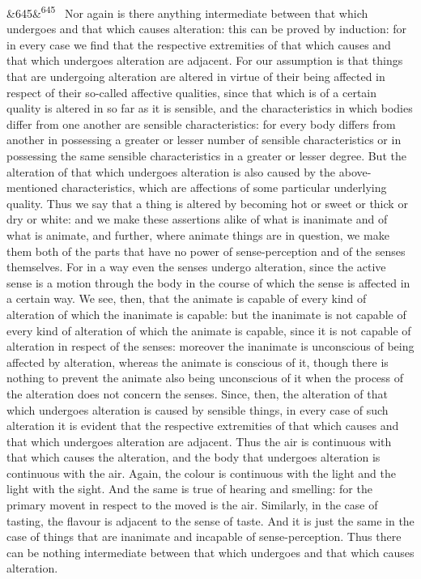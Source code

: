 \documentclass[12pt]{article}
\newcommand{\para}[1][]{\par\noindent\ifx&#1&\else\textsuperscript{\footnotesize #1}~\fi}
\begin{document}
\para[645] Nor again is there anything intermediate between that which undergoes and that which causes alteration: this can be proved by induction: for in every case we find that the respective extremities of that which causes and that which undergoes alteration are adjacent. For our assumption is that things that are undergoing alteration are altered in virtue of their being affected in respect of their so-called affective qualities, since that which is of a certain quality is altered in so far as it is sensible, and the characteristics in which bodies differ from one another are sensible characteristics: for every body differs from another in possessing a greater or lesser number of sensible characteristics or in possessing the same sensible characteristics in a greater or lesser degree. But the alteration of that which undergoes alteration is also caused by the above-mentioned characteristics, which are affections of some particular underlying quality. Thus we say that a thing is altered by becoming hot or sweet or thick or dry or white: and we make these assertions alike of what is inanimate and of what is animate, and further, where animate things are in question, we make them both of the parts that have no power of sense-perception and of the senses themselves. For in a way even the senses undergo alteration, since the active sense is a motion through the body in the course of which the sense is affected in a certain way. We see, then, that the animate is capable of every kind of alteration of which the inanimate is capable: but the inanimate is not capable of every kind of alteration of which the animate is capable, since it is not capable of alteration in respect of the senses: moreover the inanimate is unconscious of being affected by alteration, whereas the animate is conscious of it, though there is nothing to prevent the animate also being unconscious of it when the process of the alteration does not concern the senses. Since, then, the alteration of that which undergoes alteration is caused by sensible things, in every case of such alteration it is evident that the respective extremities of that which causes and that which undergoes alteration are adjacent. Thus the air is continuous with that which causes the alteration, and the body that undergoes alteration is continuous with the air. Again, the colour is continuous with the light and the light with the sight. And the same is true of hearing and smelling: for the primary movent in respect to the moved is the air. Similarly, in the case of tasting, the flavour is adjacent to the sense of taste. And it is just the same in the case of things that are inanimate and incapable of sense-perception. Thus there can be nothing intermediate between that which undergoes and that which causes alteration.
\end{document}
